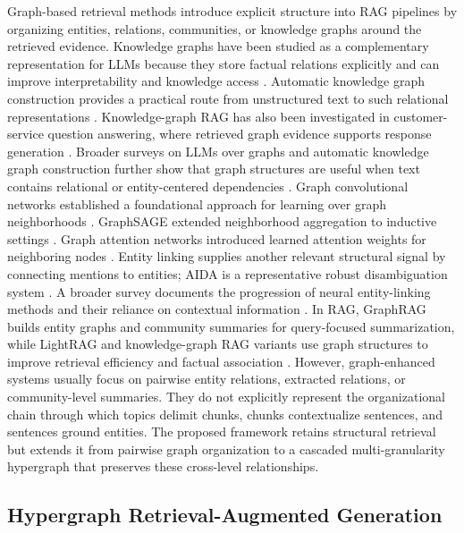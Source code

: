 \documentclass[a4paper,fleqn]{cas-dc}
\begin{document}
Graph-based retrieval methods introduce explicit structure into RAG pipelines by organizing entities, relations, communities, or knowledge graphs around the retrieved evidence. Knowledge graphs have been studied as a complementary representation for LLMs because they store factual relations explicitly and can improve interpretability and knowledge access \citep{Pan2024LLMKG}. Automatic knowledge graph construction provides a practical route from unstructured text to such relational representations \citep{Zhong2023KGConstruction}. Knowledge-graph RAG has also been investigated in customer-service question answering, where retrieved graph evidence supports response generation \citep{Xu2024KGRAGCSQA}. Broader surveys on LLMs over graphs and automatic knowledge graph construction further show that graph structures are useful when text contains relational or entity-centered dependencies \citep{Jin2024LLMGraphs}. Graph convolutional networks established a foundational approach for learning over graph neighborhoods \citep{Kipf2017GCN}. GraphSAGE extended neighborhood aggregation to inductive settings \citep{Hamilton2017GraphSAGE}. Graph attention networks introduced learned attention weights for neighboring nodes \citep{Velickovic2018GAT}. Entity linking supplies another relevant structural signal by connecting mentions to entities; AIDA is a representative robust disambiguation system \citep{Hoffart2011AIDA}. A broader survey documents the progression of neural entity-linking methods and their reliance on contextual information \citep{Sevgili2022EntityLinkingSurvey}. In RAG, GraphRAG builds entity graphs and community summaries for query-focused summarization, while LightRAG and knowledge-graph RAG variants use graph structures to improve retrieval efficiency and factual association \citep{Peng2025GraphRAGSurvey}. However, graph-enhanced systems usually focus on pairwise entity relations, extracted relations, or community-level summaries. They do not explicitly represent the organizational chain through which topics delimit chunks, chunks contextualize sentences, and sentences ground entities. The proposed framework retains structural retrieval but extends it from pairwise graph organization to a cascaded multi-granularity hypergraph that preserves these cross-level relationships.

\subsection{Hypergraph Retrieval-Augmented Generation}
\end{document}
